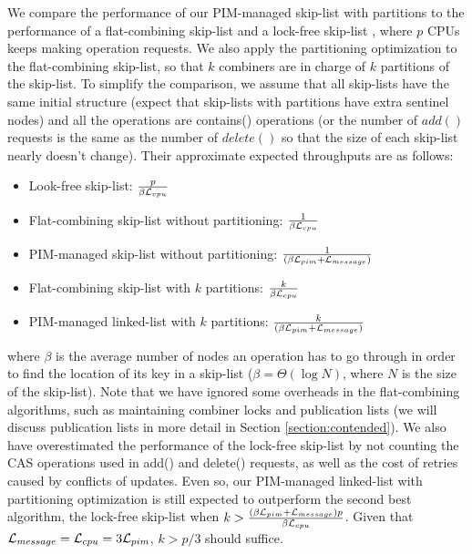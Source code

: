 We compare the performance of our PIM-managed skip-list with partitions 
to the performance of a flat-combining skip-list \cite{Hendler10}
and a lock-free skip-list \cite{Herlihy08}, 
where $p$ CPUs keeps making operation requests.
We also apply the partitioning optimization to the flat-combining skip-list, 
so that $k$ combiners are in charge of $k$ partitions of the skip-list. 
To simplify the comparison, we assume that all skip-lists have the same
initial structure (expect that skip-lists with partitions have extra sentinel nodes)
and all the operations are contains() operations
(or the number of $add()$ requests is the same as the number of $delete()$ 
so that the size of each skip-list nearly doesn't change).
Their approximate expected throughputs are as follows:
\begin{itemize}
\item Look-free skip-list:
	${p \over \beta\mathcal{L}_{cpu}}$

\item Flat-combining skip-list without partitioning:
	${1 \over \beta\mathcal{L}_{cpu}}$

\item PIM-managed skip-list without partitioning:
	${1 \over (\beta\mathcal{L}_{pim} + \mathcal{L}_{message})}$

\item Flat-combining skip-list with $k$ partitions:
    ${k \over \beta\mathcal{L}_{cpu}}$

\item PIM-managed linked-list with $k$ partitions:
    ${k \over (\beta\mathcal{L}_{pim} + \mathcal{L}_{message})}$
\end{itemize}
where $\beta$ is the average number of nodes an operation has to go through
in order to find the location of its key in a skip-list
($\beta = \Theta(\log N)$, where $N$ is the size of the skip-list).
Note that we have ignored some overheads in the flat-combining
algorithms, such as maintaining combiner locks and publication lists
(we will discuss publication lists in more detail in Section \ref{section:contended}).
We also have overestimated the performance of the lock-free skip-list by not counting the
CAS operations used in add() and delete() requests, as well as the cost of retries
caused by conflicts of updates.
Even so, our PIM-managed linked-list with partitioning optimization is
still expected to outperform the second best algorithm, the lock-free skip-list 
when $k > {(\beta\mathcal{L}_{pim} + \mathcal{L}_{message})p \over \beta\mathcal{L}_{cpu}}$.
Given that $\mathcal{L}_{message} = \mathcal{L}_{cpu} = 3\mathcal{L}_{pim}$, $k > p/3$ should suffice.

